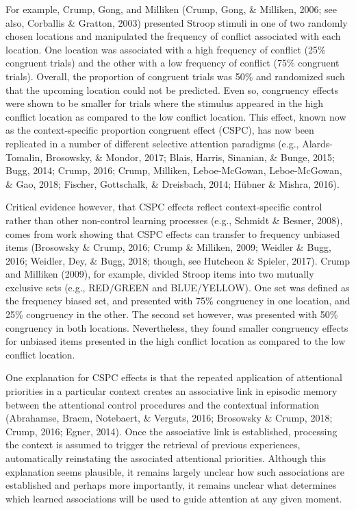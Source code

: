 \documentclass[english,,man,floatsintext]{apa6}
\begin{document}
For example, Crump, Gong, and Milliken (Crump, Gong, \& Milliken, 2006; see also, Corballis \& Gratton, 2003) presented Stroop stimuli in one of two randomly chosen locations and manipulated the frequency of conflict associated with each location. One location was associated with a high frequency of conflict (25\% congruent trials) and the other with a low frequency of conflict (75\% congruent trials). Overall, the proportion of congruent trials was 50\% and randomized such that the upcoming location could not be predicted. Even so, congruency effects were shown to be smaller for trials where the stimulus appeared in the high conflict location as compared to the low conflict location. This effect, known now as the context-specific proportion congruent effect (CSPC), has now been replicated in a number of different selective attention paradigms (e.g., Alards-Tomalin, Brosowsky, \& Mondor, 2017; Blais, Harris, Sinanian, \& Bunge, 2015; Bugg, 2014; Crump, 2016; Crump, Milliken, Leboe-McGowan, Leboe-McGowan, \& Gao, 2018; Fischer, Gottschalk, \& Dreisbach, 2014; Hübner \& Mishra, 2016).

Critical evidence however, that CSPC effects reflect context-specific control rather than other non-control learning processes (e.g., Schmidt \& Besner, 2008), comes from work showing that CSPC effects can transfer to frequency unbiased items (Brosowsky \& Crump, 2016; Crump \& Milliken, 2009; Weidler \& Bugg, 2016; Weidler, Dey, \& Bugg, 2018; though, see Hutcheon \& Spieler, 2017). Crump and Milliken (2009), for example, divided Stroop items into two mutually exclusive sets (e.g., RED/GREEN and BLUE/YELLOW). One set was defined as the frequency biased set, and presented with 75\% congruency in one location, and 25\% congruency in the other. The second set however, was presented with 50\% congruency in both locations. Nevertheless, they found smaller congruency effects for unbiased items presented in the high conflict location as compared to the low conflict location.

One explanation for CSPC effects is that the repeated application of attentional priorities in a particular context creates an associative link in episodic memory between the attentional control procedures and the contextual information (Abrahamse, Braem, Notebaert, \& Verguts, 2016; Brosowsky \& Crump, 2018; Crump, 2016; Egner, 2014). Once the associative link is established, processing the context is assumed to trigger the retrieval of previous experiences, automatically reinstating the associated attentional priorities. Although this explanation seems plausible, it remains largely unclear how such associations are established and perhaps more importantly, it remains unclear what determines which learned associations will be used to guide attention at any given moment.
\end{document}
